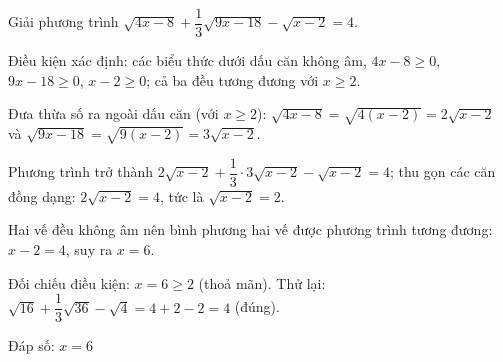 \begin{problem}[9DS-CAN-008]
Giải phương trình $\sqrt{4x - 8} + \dfrac{1}{3}\sqrt{9x - 18} - \sqrt{x - 2} = 4$.

\begin{solution}
Điều kiện xác định: các biểu thức dưới dấu căn không âm, $4x - 8 \geq 0$, $9x - 18 \geq 0$, $x - 2 \geq 0$; cả ba đều tương đương với $x \geq 2$.

Đưa thừa số ra ngoài dấu căn (với $x \geq 2$): $\sqrt{4x - 8} = \sqrt{4(x - 2)} = 2\sqrt{x - 2}$ và $\sqrt{9x - 18} = \sqrt{9(x - 2)} = 3\sqrt{x - 2}$.

Phương trình trở thành $2\sqrt{x - 2} + \dfrac{1}{3} \cdot 3\sqrt{x - 2} - \sqrt{x - 2} = 4$; thu gọn các căn đồng dạng: $2\sqrt{x - 2} = 4$, tức là $\sqrt{x - 2} = 2$.

Hai vế đều không âm nên bình phương hai vế được phương trình tương đương: $x - 2 = 4$, suy ra $x = 6$.

Đối chiếu điều kiện: $x = 6 \geq 2$ (thoả mãn). Thử lại: $\sqrt{16} + \dfrac{1}{3}\sqrt{36} - \sqrt{4} = 4 + 2 - 2 = 4$ (đúng).

Đáp số: $\boxed{x = 6}$
\end{solution}
\end{problem}

